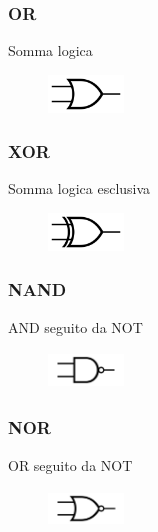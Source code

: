 \documentclass{report}
\begin{document}
        \subsubsection{OR}
            Somma logica
            \begin{center}
                \begin{figure}[H]
                    \includegraphics[width=2cm,height=1cm]{or.png}
                \end{figure}
            \end{center}
        \subsubsection{XOR}
            Somma logica esclusiva
            \begin{center}
                \begin{figure}[H]
                    \includegraphics[width=2cm,height=1cm]{xor.png}
                \end{figure}
            \end{center}
        \subsubsection{NAND}
            AND seguito da NOT
            \begin{center}
                \begin{figure}[H]
                    \includegraphics[width=2cm,height=1cm]{nand.png}
                \end{figure}
            \end{center}
        \subsubsection{NOR}
            OR seguito da NOT
            \begin{center}
                \begin{figure}[H]
                    \includegraphics[width=2cm,height=1cm]{nor.png}
                \end{figure}
            \end{center}
\end{document}
